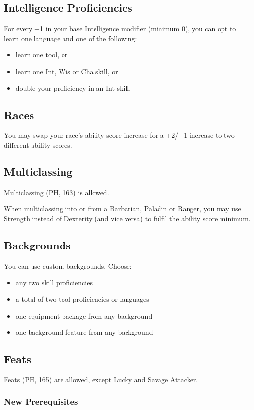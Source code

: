 \documentclass[letterpaper,twocolumn,openany,nodeprecatedcode]{dndbook}
\begin{document}
\subsection{Intelligence Proficiencies}
For every +1 in your base Intelligence modifier (minimum 0), you can opt to learn one language and one of the following:
\begin{itemize}
    \item learn one tool, or
    \item learn one Int, Wis or Cha skill, or
    \item double your proficiency in an Int skill.
\end{itemize}

\subsection{Races}
You may swap your race's ability score increase for a +2/+1 increase to two different ability scores.

\subsection{Multiclassing}
Multiclassing (PH, 163) is allowed. 

When multiclassing into or from a Barbarian, Paladin or Ranger, you may use Strength instead of Dexterity (and vice versa) to fulfil the ability score minimum. 

\subsection{Backgrounds}
You can use custom backgrounds. Choose:
\begin{itemize}
\item any two skill proficiencies 
\item a total of two tool proficiencies or languages 
\item one equipment package from any background
\item one background feature from any background
\end{itemize}

\subsection{Feats}
Feats (PH, 165) are allowed, except Lucky and Savage Attacker.

\subsubsection{New Prerequisites}
\end{document}
